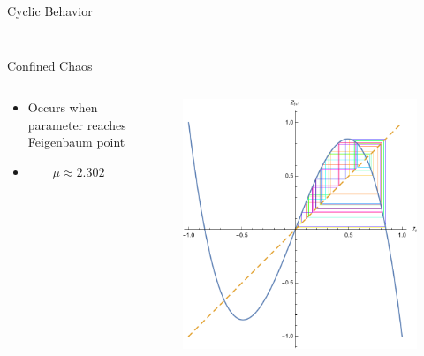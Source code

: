 \documentclass{beamer}
\begin{document}
\begin{frame}{Cyclic Behavior}
\begin{columns}
\begin{column}{0.5\textwidth}
\begin{figure}
			\end{figure}
		\end{column}
	\end{columns}
\end{frame}

\begin{frame}{Confined Chaos}
	\begin{columns}
		\begin{column}{0.5\textwidth}
			\begin{itemize}
				\item
					Occurs when parameter reaches Feigenbaum point

				\item
					\begin{equation*}
						\mu\approx2.302
					\end{equation*}
			\end{itemize}
		\end{column}
		\begin{column}{0.5\textwidth}
			\begin{figure}
				\centering
				\includegraphics[width=\textwidth]{contained_chaos.pdf}
			\end{figure}
		\end{column}
	\end{columns}
\end{frame}
\end{document}
